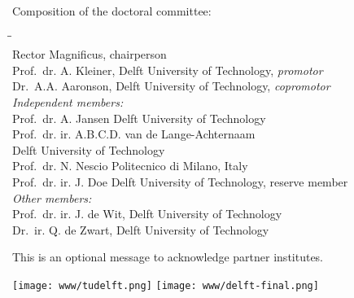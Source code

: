 \documentclass{tudelft}
\begin{document}
\begin{titlepage}
    \bigskip
    \noindent Composition of the doctoral committee:
    \begin{tabbing}
        \hspace{\tabcolsep}\=\hspace{0.33\textwidth}\=\hspace{0.66\textwidth}                   \\[-3\medskipamount]
        \> Rector Magnificus,          \> chairperson\\
        \> Prof.~dr. A. Kleiner,    \> Delft University of
Technology, \textit{promotor}    \\
        \> Dr.~A.A. Aaronson,    \> Delft University of
Technology, \textit{copromotor}    \\
        \>\textit{Independent members:}                                                        \\[\smallskipamount]
        \>Prof.~dr. A. Jansen       \> Delft University of
Technology                         \\
        \>Prof.~dr. ir. A.B.C.D. van de Lange-Achternaam\\
        \>       \> Delft University of
Technology                         \\
        \>Prof.~dr. N. Nescio       \> Politecnico di Milano,
Italy                         \\
        \>Prof.~dr. ir. J. Doe       \> Delft University of
Technology, reserve member                         \\
        \>\textit{Other members:}                                                               \\[\smallskipamount]
        \>Prof.~dr. ir. J. de Wit, \> Delft University of
Technology                         \\
        \>Dr.~ir. Q. de Zwart, \> Delft University of
Technology                         \\
    \end{tabbing}


    \medskip
    \noindent This is an optional message to acknowledge partner
institutes.

    \vfill
        \begin{center}
                                \texttt{[image: www/tudelft.png]}\hspace{1.5cm}
                        \texttt{[image: www/delft-final.png]}\hspace{1cm}
                        \end{center}
    \vfill


\end{titlepage}
\end{document}
